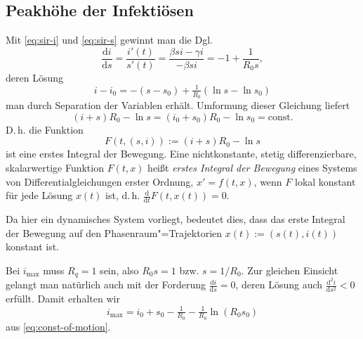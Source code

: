 \documentclass[a4paper,10pt,fleqn,twocolumn,twoside,dvipdfmx]{scrartcl}
\numberwithin{equation}{section}
\begin{document}
\subsection{Peakhöhe der Infektiösen}

Mit \eqref{eq:sir-i} und \eqref{eq:sir-s} gewinnt man die Dgl.%
\begin{equation}
\frac{\mathrm di}{\mathrm ds} = \frac{i'(t)}{s'(t)}
= \frac{\beta si - \gamma i}{-\beta si} = -1 + \frac{1}{R_0 s},
\end{equation}
deren Lösung
\begin{equation}
i-i_0 = - (s-s_0) + \tfrac{1}{R_0}(\ln s - \ln s_0)
\end{equation}
man durch Separation der Variablen erhält. Umformung dieser
Gleichung liefert%
\begin{equation}\label{eq:const-of-motion}
(i+s)R_0-\ln s = (i_0+s_0)R_0-\ln s_0 = \mathrm{const}.
\end{equation}
D.\,h. die Funktion
\begin{equation}
F(t,(s,i)) := (i+s)R_0 - \ln s
\end{equation}
ist eine erstes Integral der Bewegung. Eine nichtkonstante, stetig
differenzierbare, skalarwertige Funktion $F(t,x)$
heißt \emph{erstes Integral der Bewegung} eines Systems
von Differentialgleichungen erster Ordnung, $x'=f(t,x)$,
wenn $F$ lokal konstant für jede Lösung $x(t)$ ist, d.\,h.
$\tfrac{\mathrm d}{\mathrm dt}F(t,x(t))=0$.

Da hier ein dynamisches System vorliegt, bedeutet dies, dass
das erste Integral der Bewegung auf den
Phasenraum"=Trajektorien $x(t):=(s(t),i(t))$ konstant ist.

Bei $i_\mathrm{max}$ muss $R_q = 1$ sein, also $R_0 s = 1$ bzw.
$s = 1/R_0$. Zur gleichen Einsicht gelangt man natürlich auch
mit der Forderung $\frac{\mathrm di}{\mathrm ds}=0$, deren Lösung auch
$\frac{\mathrm d^2 i}{\mathrm ds^2}<0$ erfüllt. Damit erhalten wir
\begin{equation}
i_\mathrm{max} = i_0 + s_0 - \tfrac{1}{R_0} - \tfrac{1}{R_0}\ln(R_0 s_0)
\end{equation}
aus \eqref{eq:const-of-motion}.
\end{document}
